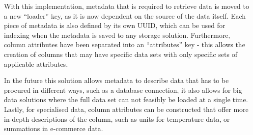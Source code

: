With this implementation, metadata that is required to retrieve data is moved to a new ``loader'' key, as it is now
dependent on the source of the data itself.
Each piece of metadata is also defined by its own UUID, which can be used for indexing when the metadata is saved to any
storage solution.
Furthermore, column attributes have been separated into an ``attributes'' key - this allows the creation of columns that
may have specific data sets with only specific sets of applicable attributes.

In the future this solution allows metadata to describe data that has to be procured in different ways, such as a database
connection, it also allows for big data solutions where the full data set can not feasibly be loaded at a single time.
Lastly, for specialised data, column attributes can be constructed that offer more in-depth descriptions of the column,
such as units for temperature data, or summations in e-commerce data.